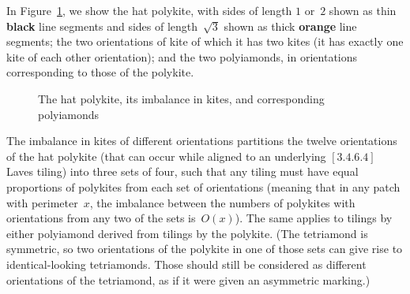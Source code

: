 In Figure~\ref{fig:kitetwocol}, we show the hat polykite, with sides
of length $1$ or~$2$ shown as thin \textcolor{\colone}{\textbf{black}}
line segments and sides of length~$\sqrt{3}$ shown as thick
\textcolor{\colroot}{\textbf{orange}} line segments; the two
orientations of kite of which it has two kites (it has exactly one
kite of each other orientation); and the two polyiamonds, in
orientations corresponding to those of the polykite.


\begin{figure}[htp!]
\begin{center}
\end{center}
\caption{The hat polykite, its imbalance in kites, and corresponding polyiamonds}
\label{fig:kitetwocol}
\end{figure}

The imbalance in kites of different orientations partitions the twelve
orientations of the hat polykite (that can occur while aligned to an
underlying $[3.4.6.4]$ Laves tiling) into three sets of four, such
that any tiling must have equal proportions of polykites from each set
of orientations (meaning that in any patch with perimeter~$x$, the
imbalance between the numbers of polykites with orientations from any
two of the sets is~$O(x)$).  The same applies to tilings by either
polyiamond derived from tilings by the polykite.  (The tetriamond is
symmetric, so two orientations of the polykite in one of those sets
can give rise to identical-looking tetriamonds.  Those should still be
considered as different orientations of the tetriamond, as if it were
given an asymmetric marking.)

